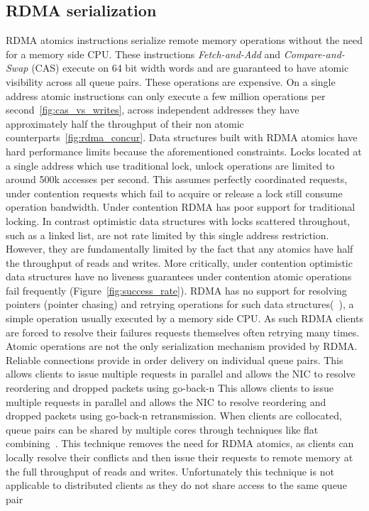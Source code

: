 \subsection{RDMA serialization} RDMA atomics instructions
serialize remote memory operations without the need for a
memory side CPU. These instructions \textit{Fetch-and-Add}
and \textit{Compare-and-Swap} (CAS) execute on 64 bit width
words and are guaranteed to have atomic visibility across
all queue pairs. These operations are expensive. On a single
address atomic instructions can only execute a few million
operations per second~\ref{fig:cas_vs_writes}, across
independent addresses they have approximately half the
throughput of their non atomic
counterparts~\ref{fig:rdma_concur}. 
Data structures built with RDMA atomics have hard
performance limits because the aforementioned constraints.
Locks located at a single address which use traditional
lock, unlock operations are limited to around 500k accesses
per second. This assumes perfectly coordinated requests,
under contention requests which fail to acquire or release a
lock still consume operation bandwidth.
Under contention RDMA has poor support for traditional
locking. In contrast optimistic data structures with locks
scattered throughout, such as a linked list, are not rate
limited by this single address restriction.  However, they
are fundamentally limited by the fact that any atomics have
half the throughput of reads and writes. More critically,
under contention optimistic data structures have no liveness
guarantees under contention atomic operations fail
frequently (Figure~\ref{fig:success_rate}).  RDMA has no
support for resolving pointers (pointer chasing) and
retrying operations for such data structures(~\cite{rma}), a
simple operation usually executed by a memory side CPU. As
such RDMA clients are forced to resolve their failures
requests themselves often retrying many times.
Atomic operations are not the only serialization mechanism
provided by RDMA. Reliable connections provide in order
delivery on individual queue pairs. This allows clients to
issue multiple requests in parallel and allows the NIC to
resolve reordering and dropped packets using go-back-n This
allows clients to issue multiple requests in parallel and
allows the NIC to resolve reordering and dropped packets
using go-back-n retransmission. When clients are collocated,
queue pairs can be shared by multiple cores through
techniques like flat combining~\cite{flock,sherman}. This
technique removes the need for RDMA atomics, as clients can
locally resolve their conflicts and then issue their
requests to remote memory at the full throughput of reads
and writes. Unfortunately this technique is not applicable
to distributed clients as they do not share access to the
same queue pair

